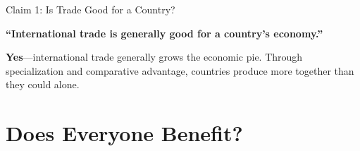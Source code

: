 \documentclass[9pt,english,aspectratio=169]{beamer}
\begin{document}
\begin{frame}{Claim 1: Is Trade Good for a Country?}
  \centering

  {\Large\textbf{``International trade is generally good for a country's economy.''}}

  \vspace{2em}
  \pause
  \begin{answerbox}
    \textbf{Yes}---international trade generally grows the economic pie.
    Through specialization and comparative advantage, countries produce more
    together than they could alone.
  \end{answerbox}

\end{frame}

\section{Does Everyone Benefit?}
\end{document}
